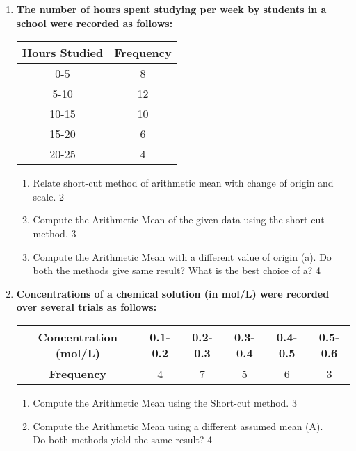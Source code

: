 \documentclass[a4paper,oneside]{book}
\begin{document}
\begin{enumerate}
     \item
\textbf{The number of hours spent studying per week by students in a school were recorded as follows:}

\begin{table}[h]
\centering
\begin{tabular}{c|c}
\textbf{Hours Studied} & \textbf{Frequency} \\ \hline
0-5                   & 8                  \\ \hline
5-10                  & 12                 \\ \hline
10-15                 & 10                 \\ \hline
15-20                 & 6                  \\ \hline
20-25                 & 4                 
\end{tabular}
\end{table}

    \begin{enumerate}
    \item
	Relate short-cut method of arithmetic mean with change of origin and scale. \hfill 2
    \item  
	Compute the Arithmetic Mean of the given data using the short-cut method. \hfill 3
    \item
	Compute the Arithmetic Mean with a different value of origin (a). Do both the methods give same result? What is the best choice of a? \hfill 4
  \end{enumerate}
  
  \item
\textbf{Concentrations of a chemical solution (in mol/L) were recorded over 
several trials as follows:} 

\begin{table}[h]
\centering
\begin{tabular}{c|ccccc}
\textbf{Concentration (mol/L)} & 0.1-0.2 & 0.2-0.3 & 0.3-0.4 & 0.4-0.5 & 0.5-0.6 \\ \hline
\textbf{Frequency}             & 4       & 7       & 5       & 6       & 3       
\end{tabular}
\end{table}

\begin{enumerate}
    \item  
    Compute the Arithmetic Mean using the Short-cut method. \hfill 3
    \item
    Compute the Arithmetic Mean using a different assumed mean (A). \\
    Do both methods yield the same result? \hfill 4
\end{enumerate}


\end{enumerate}
\end{document}
